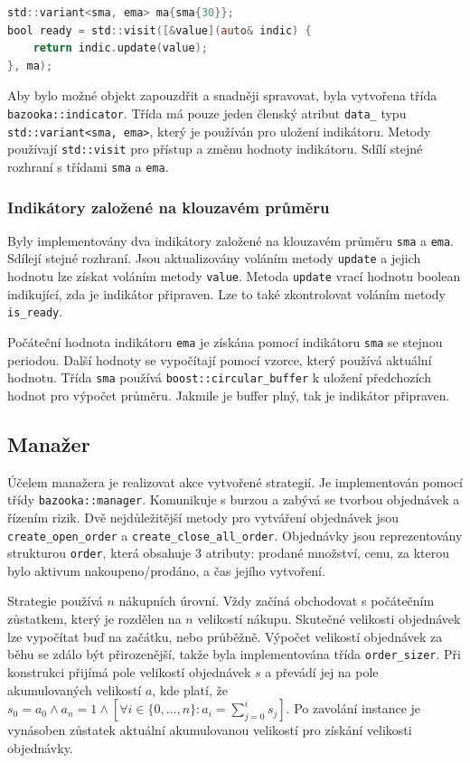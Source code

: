 \begin{lstlisting}[caption={~Aktualizace indikátoru pomocí std::visit},label={lst:update:indicator},captionpos=t,abovecaptionskip=-\medskipamount,belowcaptionskip=\medskipamount,language=C]
std::variant<sma, ema> ma{sma{30}};
bool ready = std::visit([&value](auto& indic) {
    return indic.update(value);
}, ma);
\end{lstlisting}

Aby bylo možné objekt zapouzdřit a snadněji spravovat, byla vytvořena třída \texttt{bazooka::indicator}.
Třída má pouze jeden členský atribut \texttt{data\_} typu \texttt{std::variant<sma, ema>}, který je používán pro uložení indikátoru.
Metody používají \texttt{std::visit} pro přístup a změnu hodnoty indikátoru.
Sdílí stejné rozhraní s třídami \texttt{sma} a \texttt{ema}.

\subsubsection{Indikátory založené na klouzavém průměru}
Byly implementovány dva indikátory založené na klouzavém průměru \texttt{sma} a \texttt{ema}.
Sdílejí stejné rozhraní.
Jsou aktualizovány voláním metody \texttt{update} a jejich hodnotu lze získat voláním metody \texttt{value}.
Metoda \texttt{update} vrací hodnotu boolean indikující, zda je indikátor připraven.
Lze to také zkontrolovat voláním metody \texttt{is\_ready}.

Počáteční hodnota indikátoru \texttt{ema} je získána pomocí indikátoru \texttt{sma} se stejnou periodou.
Další hodnoty se vypočítají pomocí vzorce, který používá aktuální hodnotu.
Třída \texttt{sma} používá \texttt{boost::circular\_buffer} k uložení předchozích hodnot pro výpočet průměru.
Jakmile je buffer plný, tak je indikátor připraven.

\subsection{Manažer}
Účelem manažera je realizovat akce vytvořené strategií.
Je implementován pomocí třídy \texttt{bazooka::manager}.
Komunikuje s burzou a zabývá se tvorbou objednávek a řízením rizik.
Dvě nejdůležitější metody pro vytváření objednávek jsou \texttt{create\_open\_order} a \texttt{create\_close\_all\_order}.
Objednávky jsou reprezentovány strukturou \texttt{order}, která obsahuje 3 atributy: prodané množství, cenu, za kterou bylo aktivum nakoupeno/prodáno, a čas jejího vytvoření.

Strategie používá $n$ nákupních úrovní.
Vždy začíná obchodovat s počátečním zůstatkem, který je rozdělen na $n$ velikostí nákupu.
Skutečné velikosti objednávek lze vypočítat buď na začátku, nebo průběžně.
Výpočet velikostí objednávek za běhu se zdálo být přirozenější, takže byla implementována třída \texttt{order\_sizer}.
Při konstrukci přijímá pole velikostí objednávek $s$ a převádí jej na pole akumulovaných velikostí $a$, kde platí, že $s_0 = a_0 \land a_n = 1 \land [\forall i \in \{0,\dots,n\} : a_i = \sum_{j=0}^{i} s_j]$.
Po zavolání instance je vynásoben zůstatek aktuální akumulovanou velikostí pro získání velikosti objednávky.

